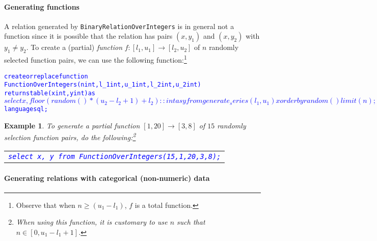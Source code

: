 \documentclass{article}
\newtheorem{example}{Example}
\begin{document}
\paragraph{Generating functions}
A relation generated by {\tt BinaryRelationOverIntegers} is in general not a function since it is
possible that the relation has pairs $(x,y_1)$ and $(x,y_2)$ with
$y_1\neq y_2$.
To create a (partial) \emph{function} $f: [l_1,u_1]\rightarrow [l_2,u_2]$ of $n$ randomly selected
function pairs, we can use the following function:\footnote{Observe that when $n\geq (u_1-l_1)$, $f$ is a
total function.}
{\small
\begin{alltt}
\textcolor{blue}{create or replace function 
FunctionOverIntegers(n int, l_1 int, u_1 int, l_2 int, u_2 int) 
   returns table (x int, y int) as
$$
   select x, floor(random() * (u_2-l_2+1) + l_2)::int as y
   from   generate_series(l_1,u_1) x order by random() limit(n);
$$ language sql;}
\end{alltt}
}

\begin{example}
To generate a partial function $[1,20]\rightarrow [3,8]$ of $15$ randomly selection function pairs, do the following:\footnote{When using this function, it is customary to use $n$ such that $n\in [0,u_1-l_1+1]$.}
{
\begin{center}
\begin{tabular}{l}
\textcolor{blue}{
{\tt select x, y from FunctionOverIntegers(15,1,20,3,8);}}
\end{tabular}
\end{center}
}
\end{example}

\newpage
\paragraph{Generating relations with categorical (non-numeric) data}
\end{document}
